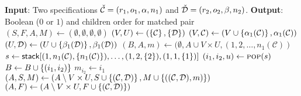 {
\setphaserulewidth{.7pt}

\begin{algorithmic}[1]
\Statex \textbf{Input}: Two specifications $\check{\mathcal{C}} = (r_1,o_1,\alpha,n_1)$ and $\check{\mathcal{D}} = (r_2,o_2,\beta,n_2)$.
\Statex \textbf{Output}: Boolean ($0$ or $1$) and children order for matched pair
\State $(S,F,A,M) \gets (\emptyset,\emptyset,\emptyset,\emptyset)$ 
        \State{}
    \EndIf
        \State{}
    \EndIf
    \State $(V,U) \gets \left(\left\{\mathcal{C}\right\}, \left\{\mathcal{D}\right\}\right)$
        \State $\left(V, \mathcal{C}\right) \gets \left(V \cup \left\{\alpha_1(\mathcal{C})\right\}, \alpha_1(\mathcal{C})\right)$
    \EndWhile
        \State $\left(U, \mathcal{D}\right) \gets \left(U \cup \left\{\beta_1(\mathcal{D})\right\}, \beta_1(\mathcal{D})\right)$
    \EndWhile
        \State {}
    \EndIf
        \State {}
    \EndIf
    \State $(B,A,m) \gets (\emptyset, A \cup V \times U, (1,2,\ldots,n_1(\mathcal{C}))$
    \State $s \gets \textsf{stack}[(1,n_1(\mathcal{C}),\left\{n_1(\mathcal{C})\right\}),\dotsc,(1,2,\left\{2\right\}),(1,1,\left\{1\right\})]$
        \State $(i_1,i_2,u) \gets \Call{pop}{s}$
            \State $B \gets B \cup \left\{(i_1,i_2)\right\}$
            \State \algorithmiccontinue
        \EndIf
        \State $m_{i_2} \gets i_1$
            \State $(A,S,M) \gets \left(A \setminus V \times U, S \cup \left\{(\mathcal{C}, \mathcal{D})\right\}, M \cup \left\{((\mathcal{C}, \mathcal{D}), m)\right\}\right)$
            \State{}
        \EndIf
            \State {}
        \EndFor
    \EndWhile
    \State $(A, F) \gets \left(A \setminus V \times U, F \cup \left\{(\mathcal{C}, \mathcal{D})\right\}\right)$
    \State{}
\EndProcedure
\State{}
\end{algorithmic}

}